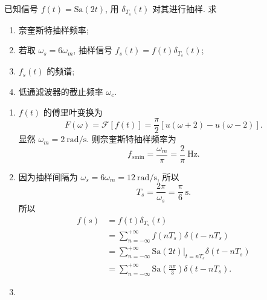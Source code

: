 \begin{exampleprob}
    已知信号 $f(t)=\mathrm{Sa}(2t)$, 用 $\delta_{T_s}(t)$ 对其进行抽样. 求

    \begin{enumerate}
        \item 奈奎斯特抽样频率;
        \item 若取 $\omega_s=6\omega_m$, 抽样信号 $f_s(t)=f(t)\delta_{T_s}(t)$;
        \item $f_s(t)$ 的频谱;
        \item 低通滤波器的截止频率 $\omega_c$.
    \end{enumerate}

    \begin{solution}
        \begin{enumerate}
            \item $f(t)$ 的傅里叶变换为 \begin{equation*}
                      F(\omega)=\mathcal{F}[f(t)]=\frac{\pi}{2}[u(\omega+2)-u(\omega-2)].
                  \end{equation*}
                  显然 $\omega_m=2\ \mathrm{rad/s}$. 则奈奎斯特抽样频率为
                  \begin{equation*}
                      f_{s\mathrm{min}}=\frac{\omega_m}{\pi}=\frac{2}{\pi}\ \mathrm{Hz}.
                  \end{equation*}
            \item 因为抽样间隔为 $\omega_s=6\omega_m=12\ \mathrm{rad/s}$, 所以
                  \begin{equation*}
                      T_s=\frac{2\pi}{\omega_s}=\frac{\pi}{6}\ \mathrm{s}.
                  \end{equation*}
                  所以
                  \begin{align*}
                      f(s) & =f(t)\delta_{T_s}(t)                                                             \\
                           & =\sum_{n=-\infty}^{+\infty}f(nT_s)\delta(t-nT_s)                                 \\
                           & =\sum_{n=-\infty}^{+\infty}\mathrm{Sa}(2t)|_{t=nT_s}\delta(t-nT_s)               \\
                           & =\sum_{n=-\infty}^{+\infty}\mathrm{Sa}\left(\frac{n\pi}{3}\right)\delta(t-nT_s).
                  \end{align*}
            \item \begin{align*}

\end{align*}
\end{enumerate}
\end{solution}
\end{exampleprob}
